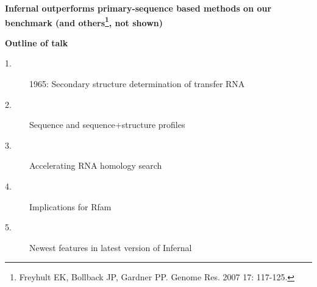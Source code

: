 \documentclass[landscape]{slides}
\begin{document}
\begin{slide}
\begin{center}

\textbf{Infernal outperforms primary-sequence based methods on our
  benchmark (and others\footnote{Freyhult EK, Bollback JP, Gardner
    PP. Genome Res. 2007 17: 117-125.}, not shown)}

\end{center}
\medskip


\vfill 
\end{slide}
\begin{slide}
\begin{center}
\textbf{Outline of talk}

\begin{description}
\item[1.] 1965: Secondary structure determination of transfer RNA
\item[2.] Sequence and sequence+structure profiles
\item[\textcolor{myorange}{3.}] \textcolor{myorange}{Accelerating RNA homology search}
\item[4.] Implications for Rfam
\item[5.] Newest features in latest version of Infernal
\end{description}

\end{center}
\vfill
\end{slide}
\end{document}
